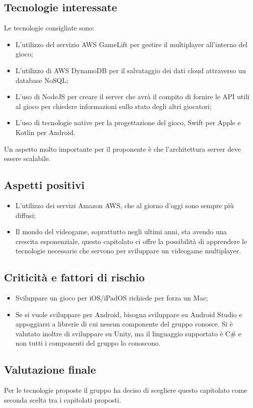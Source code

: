\subsection{Tecnologie interessate}
Le tecnologie consigliate sono:
\begin{itemize}
\item L'utilizzo del servizio AWS GameLift per gestire il multiplayer all'interno del gioco;
\item L'utilizzo di AWS DynamoDB per il salvataggio dei dati cloud attraverso un database NoSQL;
\item L'uso di NodeJS per creare il server che avrà il compito di fornire le API utili al gioco per chiedere informazioni sullo stato degli altri giocatori;
\item L'uso di tecnologie native per la progettazione del gioco, Swift per Apple e Kotlin per Android.
\end{itemize}
Un aspetto molto importante per il proponente è che l'architettura server deve essere scalabile.

\subsection{Aspetti positivi}
\begin{itemize}
\item L'utilizzo dei servizi Amazon AWS, che al giorno d'oggi sono sempre più diffusi;
\item Il mondo del videogame, soprattutto negli ultimi anni, sta avendo una crescita esponenziale, questo capitolato ci offre la possibilità di apprendere le tecnologie necessarie che servono per sviluppare un videogame multiplayer.
\end{itemize}

\subsection{Criticità e fattori di rischio}
\begin{itemize}
\item Sviluppare un gioco per iOS/iPadOS richiede per forza un Mac;
\item Se si vuole sviluppare per Android, bisogna sviluppare su Android Studio e appoggiarsi a librerie di cui nessun componente del gruppo conosce. 
Si è valutato inoltre di sviluppare su Unity, ma il linguaggio supportato è C\# e non tutti i componenti del gruppo lo conoscono.
\end{itemize}

\subsection{Valutazione finale}
Per le tecnologie proposte il gruppo \Gruppo{} ha deciso di scegliere questo capitolato come seconda scelta tra i capitolati proposti.